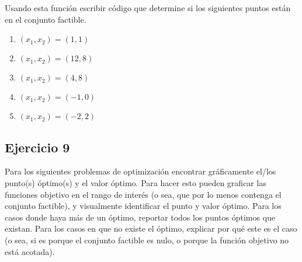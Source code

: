\documentclass[12pt]{article}
\begin{document}
Usando esta función escribir código que determine si los siguientes puntos están en el conjunto factible.
\begin{enumerate}[label=\alph*)]
    \item $(x_1,x_2) = (1,1)$
    \item $(x_1,x_2) = (12,8)$
    \item $(x_1,x_2) = (4,8)$
    \item $(x_1,x_2) = (-1,0)$
    \item $(x_1,x_2) = (-2,2)$
\end{enumerate}
    
\subsection{Ejercicio 9}
Para los siguientes problemas de optimización encontrar gráficamente el/los punto(s) óptimo(s) y el valor óptimo. Para hacer esto pueden graficar las funciones objetivo en el rango de interés (o sea, que por lo menos contenga el conjunto factible), y visualmente identificar el punto y valor óptimo. Para los casos donde haya más de un óptimo, reportar todos los puntos óptimos que existan. Para los casos en que no existe el óptimo, explicar por qué este es el caso (o sea, si es porque el conjunto factible es nulo, o porque la función objetivo no está acotada).
\end{document}
